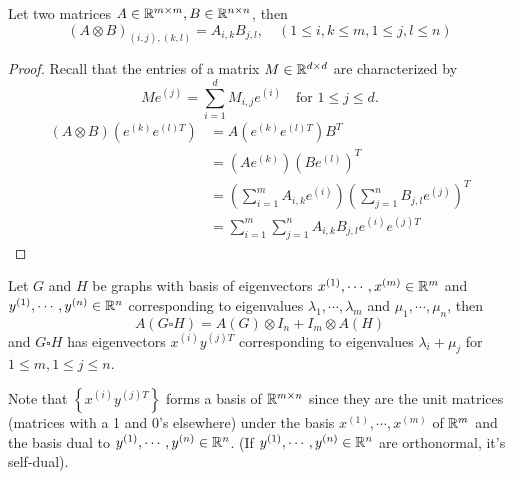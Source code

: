 \begin{lemma}
Let two matrices \(A\in\mathbb{R}^{m\times m},B\in\mathbb{R}^{n\times n}\), then
\[ (A\otimes B)_{(i,j),(k,l)}=A_{i,k}B_{j,l}, \quad (1\leq i,k\leq m,1\leq j,l\leq n) \]
\end{lemma}
\begin{proof}
Recall that the entries of a matrix \(M\in\mathbb{R}^{d\times d}\) are characterized by
\[ Me^{(j)}=\sum_{i=1}^{d}M_{i,j}e^{(i)} \quad \text{for } 1\leq j\leq d. \]
\begin{align*}
(A\otimes B)\left(e^{(k)}e^{(l)T}\right)&=A\left(e^{(k)}e^{(l)T}\right)B^T\\
&=\left(Ae^{(k)}\right)\left(Be^{(l)}\right)^T\\
&=\left(\sum_{i=1}^m A_{i,k}e^{(i)}\right)\left(\sum_{j=1}^n B_{j,l}e^{(j)}\right)^T\\
&=\sum_{i=1}^m \sum_{j=1}^n A_{i,k}B_{j,l} e^{(i)}e^{(j)T}
\end{align*}
\end{proof}

\begin{corollary}
Let \(G\) and \(H\) be graphs with basis of eigenvectors \(x^{(1)},\cdots,x^{(m)}\in\mathbb{R}^m\) and \(y^{(1)},\cdots,y^{(n)}\in\mathbb{R}^n\) corresponding to eigenvalues \(\lambda_1,\cdots,\lambda_m\) and \(\mu_1,\cdots,\mu_n\), then
\[ A(G\square H)=A(G)\otimes I_n + I_m\otimes A(H) \]
and \(G\square H\) has eigenvectors \(x^{(i)}y^{(j)T}\) corresponding to eigenvalues \(\lambda_i+\mu_j\) for \(1\leq m,1\leq j\leq n\).
\end{corollary}
\begin{remark}
Note that \(\left\{x^{(i)}y^{(j)T}\right\}\) forms a basis of \(\mathbb{R}^{m\times n}\) since they are the unit matrices (matrices with a 1 and 0's elsewhere) under the basis \(x^{(1)},\cdots,x^{(m)}\) of \(\mathbb{R}^m\) and the basis dual to \(y^{(1)},\cdots,y^{(n)}\in\mathbb{R}^n\).
(If \(y^{(1)},\cdots,y^{(n)}\in\mathbb{R}^n\) are orthonormal, it's self-dual).
\end{remark}
